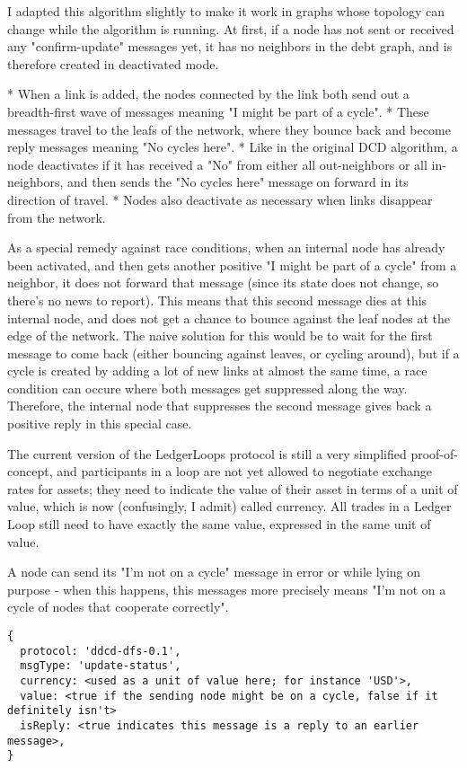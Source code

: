 \documentclass[11pt,twoside,a4paper]{article}
\begin{document}
I adapted this algorithm slightly to make it work in graphs whose topology can change while the algorithm is running. At first, if a node has not sent or received any "confirm-update" messages yet, it has no neighbors in the debt graph, and is therefore created in deactivated mode.

* When a link is added, the nodes connected by the link both send out a breadth-first wave of messages meaning "I might be part of a cycle".
* These messages travel to the leafs of the network, where they bounce back and become reply messages meaning "No cycles here".
* Like in the original DCD algorithm, a node deactivates if it has received a "No" from either all out-neighbors or all in-neighbors, and then sends the "No cycles here" message on forward in its direction of travel.
* Nodes also deactivate as necessary when links disappear from the network.

As a special remedy against race conditions, when an internal node has already been activated, and then gets another positive "I might be part of a cycle" from a neighbor, it does not forward that message (since its state does not change, so there's no news to report). This means that this second message dies at this internal node, and does not get a chance to bounce against the leaf nodes at the edge of the network. The naive solution for this would be to wait for the first message to come back (either bouncing against leaves, or cycling around), but if a cycle is created by adding a lot of new links at almost the same time, a race condition can occure where both messages get suppressed along the way. Therefore, the internal node that suppresses the second message gives back a positive reply in this special case.

The current version of the LedgerLoops protocol is still a very simplified proof-of-concept, and participants in a loop are not yet allowed to negotiate exchange rates for assets; they need to indicate the value of their asset in terms of a unit of value, which is now (confusingly, I admit) called currency. All trades in a Ledger Loop still need to have exactly the same value, expressed in the same unit of value.

A node can send its "I'm not on a cycle" message in error or while lying on purpose - when this happens, this messages more precisely means "I'm not on a cycle of nodes that cooperate correctly".

\begin{lstlisting}
{
  protocol: 'ddcd-dfs-0.1',
  msgType: 'update-status',
  currency: <used as a unit of value here; for instance 'USD'>,
  value: <true if the sending node might be on a cycle, false if it definitely isn't>
  isReply: <true indicates this message is a reply to an earlier message>,
}
\end{lstlisting}
\end{document}
